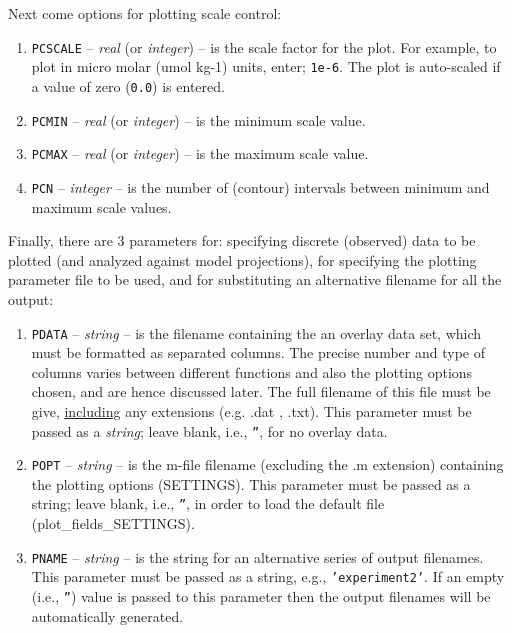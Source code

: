\documentclass[11pt,fleqn]{book} %
\begin{document}
Next come options for plotting scale control:

\vspace{1mm}
\begin{enumerate}
\item \texttt{PCSCALE} -- \textit{real} (or \textit{integer}) -- is the scale factor for the plot. For example, to plot in micro molar (umol kg-1) units, enter; \texttt{1e-6}. The plot is auto-scaled if a value of zero (\texttt{0.0}) is entered.
\item \texttt{PCMIN} -- \textit{real} (or \textit{integer}) -- is the minimum scale value.
\item \texttt{PCMAX} -- \textit{real} (or \textit{integer}) -- is the maximum scale value.
\item \texttt{PCN} -- \textit{integer} -- is the number of (contour) intervals between minimum and maximum scale values.
\end{enumerate}
\vspace{1mm}

Finally, there are 3 parameters for: specifying discrete (observed) data to be plotted (and analyzed against model projections), for specifying the plotting parameter file to be used, and for substituting an alternative filename for all the output:

\vspace{1mm}
\begin{enumerate}
\item \texttt{PDATA} -- \textit{string} -- is the filename containing the an overlay data set, which must be formatted as separated columns. The precise number and type of columns varies between different functions and also the plotting options chosen, and are hence discussed later. The full filename of this file must be give, \uline{including} any extensions (e.g. \footnotesize\textsf{.dat }\normalsize, \footnotesize\textsf{.txt}\normalsize). This parameter must be passed as a \textit{string}; leave blank, i.e., \texttt{''}, for no overlay data.
\item \texttt{POPT} -- \textit{string} -- is the \footnotesize\textsf{m-file }\normalsize filename (excluding the \footnotesize\textsf{.m }\normalsize extension) containing the plotting options (\footnotesize\textsf{SETTINGS}\normalsize). This parameter must be passed as a string; leave blank, i.e., \texttt{''}, in order to load the default file (\footnotesize\textsf{plot\_fields\_SETTINGS}\normalsize).
\item \texttt{PNAME} -- \textit{string} -- is the string for an alternative series of output filenames. This parameter must be passed as a string, e.g., \texttt{'experiment2'}. If an empty (i.e., \texttt{''}) value is passed to this parameter then the output filenames will be automatically generated.
\end{enumerate}
\vspace{1mm}
\end{document}
